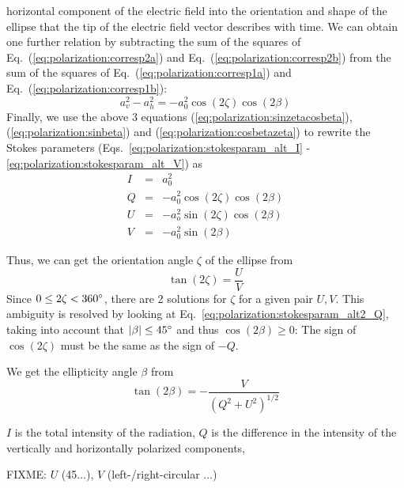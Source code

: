 horizontal component of the electric field into the orientation and
shape of the ellipse that the tip of the electric field vector describes with
time.  We can obtain one further relation by subtracting the sum of
the squares of Eq.~(\ref{eq:polarization:corresp2a}) and
Eq.~(\ref{eq:polarization:corresp2b}) from the sum of the squares of
Eq.~(\ref{eq:polarization:corresp1a}) and
Eq.~(\ref{eq:polarization:corresp1b}):
\begin{equation}
  \label{eq:polarization:cosbetazeta}
 a_v^2 - a_h^2 =  -a_0^2 \cos(2\zeta)\cos(2\beta)
\end{equation}
Finally, we use the above 3 equations
(\ref{eq:polarization:sinzetacosbeta}), 
(\ref{eq:polarization:sinbeta}) and 
(\ref{eq:polarization:cosbetazeta}) to rewrite the Stokes parameters
(Eqs.~\ref{eq:polarization:stokesparam_alt_I}%
-\ref{eq:polarization:stokesparam_alt_V}) 
as
\begin{eqnarray}
  \label{eq:polarization:stokesparam_alt2_I}
 I &=& a_0^2\\
  \label{eq:polarization:stokesparam_alt2_Q}
 Q &=&  -a_0^2 \cos(2\zeta)\cos(2\beta)\\ 
  \label{eq:polarization:stokesparam_alt2_U}
 U &=& -a_o^2 \sin(2\zeta)\cos(2\beta)\\
  \label{eq:polarization:stokesparam_alt2_V}
 V &=& -a_0^2 \sin(2\beta)
\end{eqnarray}

Thus, we can get the orientation angle $\zeta$ of the ellipse from
\begin{equation}
  \label{eq:polarization:tan2zeta}
 \tan(2\zeta) = \frac{U}{V}
\end{equation}
Since $0 \leq 2\zeta < 360^\circ$, there are 2 solutions for $\zeta$ for a
given pair $U,V$. This ambiguity is resolved by looking at
Eq.~\ref{eq:polarization:stokesparam_alt2_Q}, taking into account that
$|\beta| \leq 45^\circ$ and thus $\cos(2\beta) \geq 0$:
The sign of $\cos(2\zeta)$ must be the same as the sign of $-Q$.

We get the ellipticity angle $\beta$  from
\begin{equation}
  \label{eq:polarization:tan2beta}
 \tan(2\beta) = - \frac{V}{(Q^2 + U^2)^{1/2}}  
\end{equation}

$I$ is the total intensity of the radiation, 
$Q$ is the difference in the intensity of the vertically and
horizontally polarized components, 

FIXME: $U$ (45\degree ...), $V$ (left-/right-circular ...)

